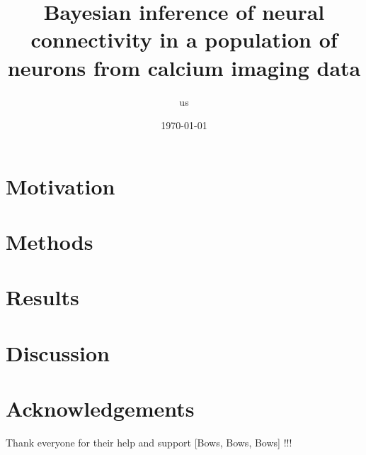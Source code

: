 \documentclass[amsmath, amssymb]{revtex4}
\begin{document}
\author{us}

\date{\today}

\title{Bayesian inference of neural connectivity in a population of neurons from 
calcium imaging data}


\begin{abstract}

\end{abstract}

\maketitle
\tableofcontents

\section{Motivation}
\label{intro}


\section{Methods}
\label{sec:methods}



\section{Results}
\label{sec:results}


\section{Discussion}
\label{sec:discussion}


\section*{Acknowledgements}
Thank everyone for their help and support [Bows, Bows, Bows] !!!



\end{document}
